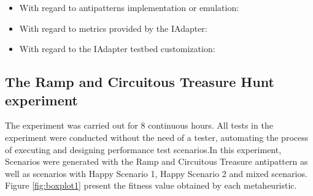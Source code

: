 \begin{itemize}
\item With regard to antipatterns implementation or emulation:
\end{itemize}

\begin{itemize}
\item With regard to metrics provided by the IAdapter:
\end{itemize}

\begin{itemize}
\item With regard to the IAdapter testbed customization:
\end{itemize}

\subsection{The Ramp and Circuitous Treasure Hunt experiment}

The experiment was carried out for 8 continuous hours.  All tests in the experiment were conducted without the need of a tester, automating the process of executing and designing performance test scenarios.In this experiment, Scenarios were generated with the Ramp and Circuitous Treasure antipattern as well as scenarios with Happy Scenario 1, Happy Scenario 2 and mixed scenarios. Figure \ref{fig:boxplot1} present the fitness value obtained by each metaheuristic.

